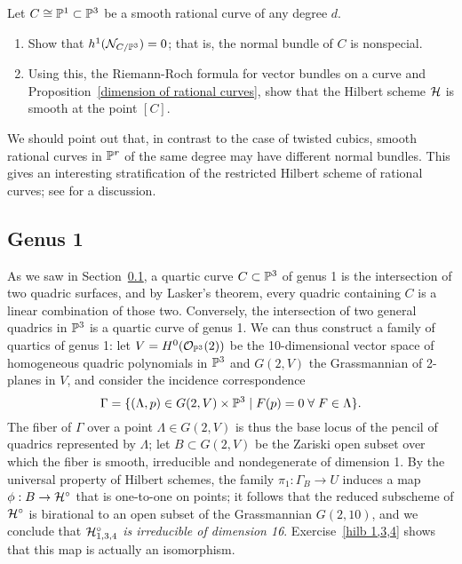 \begin{exercise}
Let $C \cong \PP^1 \subset \PP^3$ be a smooth rational curve of any degree $d$. 
\begin{enumerate}
\item Show that $h^1(\cN_{C/\PP^3}) = 0$; that is, the normal bundle of $C$ is nonspecial.
\item Using this, the Riemann-Roch formula for vector bundles on a curve and Proposition~\ref{dimension of rational curves}, show that the Hilbert scheme $\cH$ is smooth at the point $[C]$.
\end{enumerate} 
\end{exercise}

We should point out that, in contrast to the case of twisted cubics, smooth rational curves in $\PP^r$ of the same degree may have different normal bundles. This gives an interesting stratification of the restricted Hilbert scheme of rational curves; see \cite{RiedlPaper} for a discussion.

\subsection{Genus 1}
 As we saw in Section~\ref{}, a quartic curve $C \subset \PP^3$ of genus 1 is the intersection of two quadric surfaces, and by Lasker's theorem, every quadric containing $C$ is a linear combination of those two. Conversely, the intersection of two general quadrics in $\PP^3$ is a quartic curve of genus 1. We can thus construct a family of quartics of genus 1: let $V = H^0(\cO_{\PP^3}(2))$ be the 10-dimensional vector space of homogeneous quadric polynomials in $\PP^3$ and $G(2,V)$ the Grassmannian of 2-planes in $V$, and consider the incidence correspondence
$$
\Gamma = \{ (\Lambda, p) \in G(2,V) \times \PP^3 \mid F(p)=0 \; \forall \; F \in \Lambda \}.
$$
The fiber of $\Gamma$ over a point $\Lambda \in G(2,V)$ is thus the base locus of the pencil of quadrics represented by $\Lambda$; let $B \subset G(2,V)$ be the Zariski open subset over which the fiber is smooth, irreducible and nondegenerate of dimension 1. By the universal property of Hilbert schemes, the family $\pi_1 : \Gamma_B \to U$ induces a map $\phi : B \to \cH^\circ$ that is one-to-one on points; it follows that the reduced subscheme of $\cH^\circ$ is birational to an open subset of the Grassmannian $G(2,10)$, and we conclude that \emph{$\cH^\circ_{1,3,4}$ is irreducible of dimension 16}. Exercise~\ref{hilb 1,3,4} shows that this map is actually an isomorphism.

